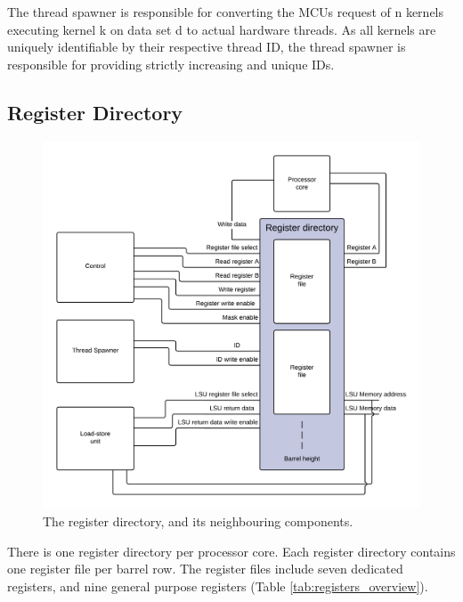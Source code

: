 \documentclass[../main/report.tex]{subfiles}
\begin{document}
The thread spawner is responsible for converting the MCUs request of n kernels executing kernel k on data set d to actual hardware threads.
As all kernels are uniquely identifiable by their respective thread ID, the thread spawner is responsible for providing strictly increasing and unique IDs.


\subsection{Register Directory}
\begin{figure}[H]
	\centering
	\includegraphics[width=\textwidth]{../gpu/diagrams/register_directory.png}
	\caption{The register directory, and its neighbouring components.}
	\label{fig:register_directory}
\end{figure}

There is one register directory per processor core.
Each register directory contains one register file per barrel row.
The register files include seven dedicated registers, and nine general purpose registers (Table \ref{tab:registers_overview}).
\end{document}
